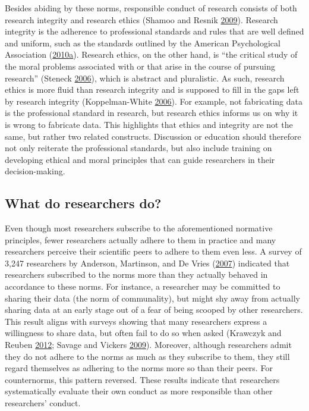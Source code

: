 \documentclass[a5paper]{book}
\begin{document}
Besides abiding by these norms, responsible conduct of research consists
of both research integrity and research ethics (Shamoo and Resnik
\protect\hyperlink{ref-isbn:9780199376025}{2009}). Research integrity is
the adherence to professional standards and rules that are well defined
and uniform, such as the standards outlined by the American
Psychological Association
(\protect\hyperlink{ref-apa2010}{2010}\protect\hyperlink{ref-apa2010}{a}).
Research ethics, on the other hand, is \enquote{the critical study of
the moral problems associated with or that arise in the course of
pursuing research} (Steneck
\protect\hyperlink{ref-doi:10.1007ux2fpl00022268}{2006}), which is
abstract and pluralistic. As such, research ethics is more fluid than
research integrity and is supposed to fill in the gaps left by research
integrity (Koppelman-White
\protect\hyperlink{ref-doi:10.1080ux2f08989620600848611}{2006}). For
example, not fabricating data is the professional standard in research,
but research ethics informs us on why it is wrong to fabricate data.
This highlights that ethics and integrity are not the same, but rather
two related constructs. Discussion or education should therefore not
only reiterate the professional standards, but also include training on
developing ethical and moral principles that can guide researchers in
their decision-making.

\subsection{What do researchers do?}\label{what-do-researchers-do}

Even though most researchers subscribe to the aforementioned normative
principles, fewer researchers actually adhere to them in practice and
many researchers perceive their scientific peers to adhere to them even
less. A survey of 3,247 researchers by Anderson, Martinson, and De Vries
(\protect\hyperlink{ref-doi:10.1525ux2fjer.2007.2.4.3}{2007}) indicated
that researchers subscribed to the norms more than they actually behaved
in accordance to these norms. For instance, a researcher may be
committed to sharing their data (the norm of communality), but might shy
away from actually sharing data at an early stage out of a fear of being
scooped by other researchers. This result aligns with surveys showing
that many researchers express a willingness to share data, but often
fail to do so when asked (Krawczyk and Reuben
\protect\hyperlink{ref-doi:10.1080ux2f08989621.2012.678688}{2012};
Savage and Vickers
\protect\hyperlink{ref-doi:10.1371ux2fjournal.pone.0007078}{2009}).
Moreover, although researchers admit they do not adhere to the norms as
much as they subscribe to them, they still regard themselves as adhering
to the norms more so than their peers. For counternorms, this pattern
reversed. These results indicate that researchers systematically
evaluate their own conduct as more responsible than other researchers'
conduct.
\end{document}
